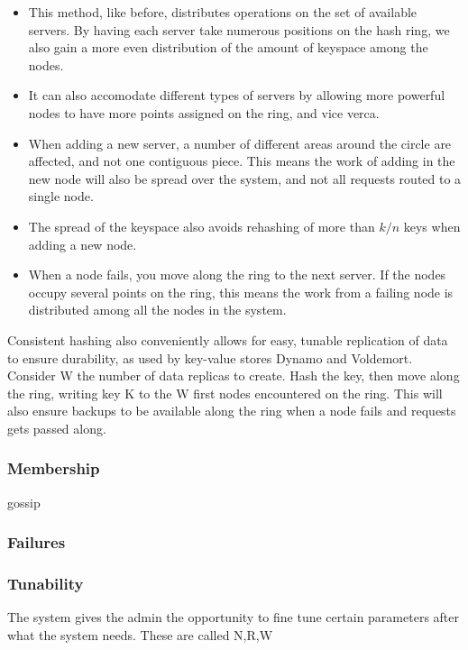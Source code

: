 \begin{itemize}
\item This method, like before, distributes operations on the set of available servers. By having each server take numerous positions on the hash ring, we also gain a more even distribution of the amount of keyspace among the nodes.

\item It can also accomodate different types of servers by allowing more powerful nodes to have more points assigned on the ring, and vice verca. 

\item When adding a new server, a number of different areas around the circle are affected, and not one contiguous piece. This means the work of adding in the new node will also be spread over the system, and not all requests routed to a single node.

\item The spread of the keyspace also avoids rehashing of more than $k/n$ keys when adding a new node. 

\item When a node fails, you move along the ring to the next server. If the nodes occupy several points on the ring, this means the work from a failing node is distributed among all the nodes in the system.
\end{itemize}

Consistent hashing also conveniently allows for easy, tunable replication of data to ensure durability, as used by key-value stores Dynamo\cite{dynamo} and Voldemort. Consider W the number of data replicas to create. Hash the key, then move along the ring, writing key K to the W first nodes encountered on the ring. This will also ensure backups to be available along the ring when a node fails and requests gets passed along.

\subsubsection{Membership}
gossip

\subsubsection{Failures}

\subsubsection{Tunability}
The system gives the admin the opportunity to fine tune certain parameters after what the system needs.
These are called N,R,W

